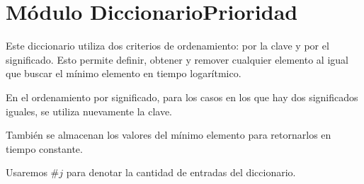 \section{Módulo DiccionarioPrioridad}

Este diccionario utiliza dos criterios de ordenamiento: por la clave y por el significado. Esto permite definir, obtener y remover cualquier elemento al igual que buscar el mínimo elemento en tiempo logarítmico.

En el ordenamiento por significado, para los casos en los que hay dos significados iguales, se utiliza nuevamente la clave.

También se almacenan los valores del mínimo elemento para retornarlos en tiempo constante.

Usaremos $\#j$ para denotar la cantidad de entradas del diccionario.

